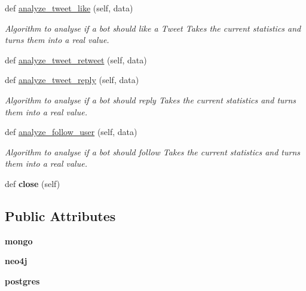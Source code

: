 \begin{DoxyCompactItemize}
def \hyperlink{classtwitter_1_1control__center_1_1PDP_1_1PDP_af6e05300883ddb19bcd9c6047e000ec1}{analyze\+\_\+tweet\+\_\+like} (self, data)
\begin{DoxyCompactList}\small\item\em Algorithm to analyse if a bot should like a Tweet Takes the current statistics and turns them into a real value. \end{DoxyCompactList}\item 
def \hyperlink{classtwitter_1_1control__center_1_1PDP_1_1PDP_ae173efc2c97b103ad0fbb0484c27835a}{analyze\+\_\+tweet\+\_\+retweet} (self, data)
\item 
def \hyperlink{classtwitter_1_1control__center_1_1PDP_1_1PDP_acbac2033b2853b89b3ee19ed040586e8}{analyze\+\_\+tweet\+\_\+reply} (self, data)
\begin{DoxyCompactList}\small\item\em Algorithm to analyse if a bot should reply Takes the current statistics and turns them into a real value. \end{DoxyCompactList}\item 
def \hyperlink{classtwitter_1_1control__center_1_1PDP_1_1PDP_ab9d69b04d93fc8b6fead61fd98991c22}{analyze\+\_\+follow\+\_\+user} (self, data)
\begin{DoxyCompactList}\small\item\em Algorithm to analyse if a bot should follow Takes the current statistics and turns them into a real value. \end{DoxyCompactList}\item 
\mbox{\label{classtwitter_1_1control__center_1_1PDP_1_1PDP_ac3d2ce5166ecab928b14d231b322523f}} 
def {\bfseries close} (self)
\end{DoxyCompactItemize}
\subsection*{Public Attributes}
\begin{DoxyCompactItemize}
\item 
\mbox{\label{classtwitter_1_1control__center_1_1PDP_1_1PDP_ac625eb8534bd8073613e9cccb21f1999}} 
{\bfseries mongo}
\item 
\mbox{\label{classtwitter_1_1control__center_1_1PDP_1_1PDP_aba6c617ea663cbe89a36c4a879f0dda1}} 
{\bfseries neo4j}
\item 
\mbox{\label{classtwitter_1_1control__center_1_1PDP_1_1PDP_afa535f42bb7f0e2e73f7acae08723756}} 
{\bfseries postgres}
\end{DoxyCompactItemize}

